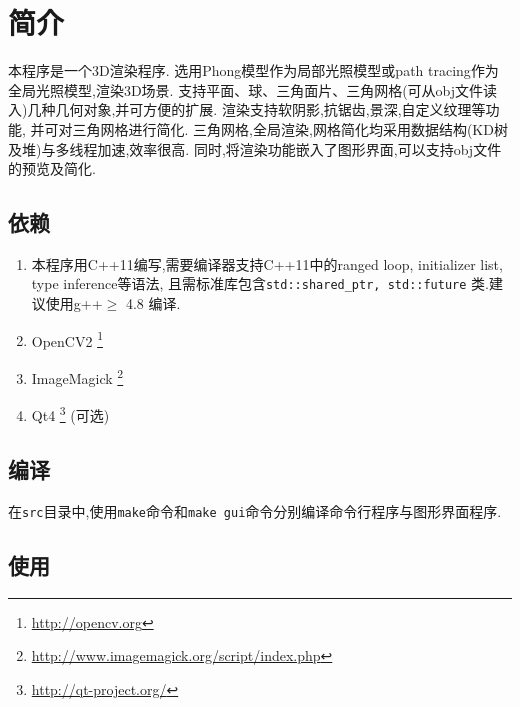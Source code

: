 
\section{简介}
本程序是一个3D渲染程序.
选用Phong模型\cite{phong}作为局部光照模型或path tracing\cite{pathtracing}作为全局光照模型,渲染3D场景.
支持平面、球、三角面片、三角网格(可从obj文件读入)几种几何对象,并可方便的扩展.
渲染支持软阴影,抗锯齿,景深,自定义纹理等功能, 并可对三角网格进行简化.
三角网格,全局渲染,网格简化均采用数据结构(KD树及堆)与多线程加速,效率很高.
同时,将渲染功能嵌入了图形界面,可以支持obj文件的预览及简化.

\subsection{依赖}
\begin{enumerate}
  \item 本程序用C++11编写,需要编译器支持C++11中的ranged loop, initializer list, type inference等语法,
    且需标准库包含\verb|std::shared_ptr, std::future|
    类.建议使用g++$ \ge$ 4.8 编译.

  \item OpenCV2 \footnote{\url{http://opencv.org}}

  \item ImageMagick \footnote{\url{http://www.imagemagick.org/script/index.php}}

\item Qt4  \footnote{\url{http://qt-project.org/}} (可选)
\end{enumerate}


\subsection{编译}
在\verb|src|目录中,使用\verb|make|命令和\verb|make gui|命令分别编译命令行程序与图形界面程序.

\subsection{使用}

